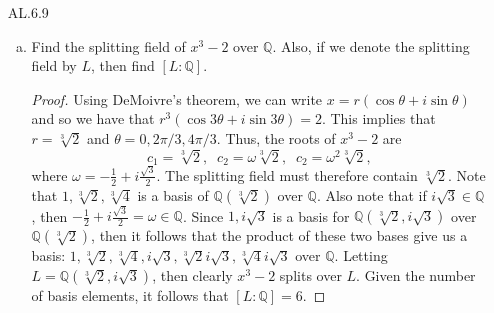 \documentclass[12pt]{article}
\begin{document}
\begin{enumerate}
\begin{enumerate}[(a)]
\begin{proof}
                        splitting field of $x^{p^n}-x$ and since all the roots
                        are distinct, then the polynomial is seperable. 
                    \end{proof}
            \end{enumerate}
        \item[AL.6.9]\hfill\par
            \begin{enumerate}[(a)]
                \item Find the splitting field of $x^3-2$ over $\mathbb{Q}$.
                    Also, if we denote the splitting field by $L$, then find
                    $[L:\mathbb{Q}]$. 
                    \begin{proof}
                        Using DeMoivre's theorem, we can write
                        $x=r(\cos\theta+i\sin\theta)$ and so we have that
                        $r^3(\cos3\theta+i\sin3\theta)=2$. This implies that
                        $r=\sqrt[3]{2}$ and $\theta=0, 2\pi/3, 4\pi/3$. Thus,
                        the roots of $x^3-2$ are 
                        \begin{equation*}
                            c_1=\sqrt[3]{2}, \;\;c_2=\omega\sqrt[3]{2},
                            \;\;c_2=\omega^2\sqrt[3]{2},    
                        \end{equation*}
                        where $\omega=-\frac{1}{2}+i\frac{\sqrt{3}}{2}$. The
                        splitting field must therefore contain $\sqrt[3]{2}$.
                        Note that $1, \sqrt[3]{2}, \sqrt[3]{4}$ is a basis of
                        $\mathbb{Q}(\sqrt[3]{2})$ over $\mathbb{Q}$. Also note
                        that if $i\sqrt{3}\in\mathbb{Q}$, then
                        $-\frac{1}{2}+i\frac{\sqrt{3}}{2}=\omega\in\mathbb{Q}$.
                        Since $1, i\sqrt{3}$ is a basis for
                        $\mathbb{Q}(\sqrt[3]{2}, i\sqrt{3})$ over
                        $\mathbb{Q}(\sqrt[3]{2})$, then it follows that the
                        product of these two bases give us a basis: $1,
                        \sqrt[3]{2}, \sqrt[3]{4}, i\sqrt{3}, \sqrt[3]{2}
                        i\sqrt{3}, \sqrt[3]{4} i\sqrt{3}$ over $\mathbb{Q}$.
                        Letting $L=\mathbb{Q}(\sqrt[3]{2}, i\sqrt{3})$, then
                        clearly $x^3-2$ splits over $L$. Given the number of
                        basis elements, it follows that $[L:\mathbb{Q}]=6$.           
                    \end{proof}

\end{enumerate}
\end{enumerate}
\end{document}
